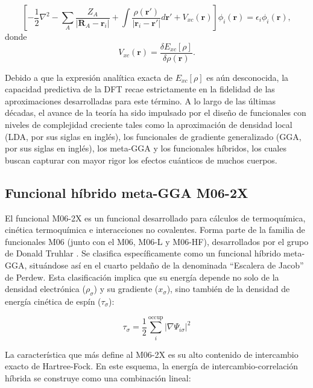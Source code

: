 \begin{equation}
    \left[ -\frac{1}{2}\nabla^2 - \sum_A \frac{Z_A}{|\mathbf{R}_{A} - \mathbf{r}_i|} + \int \frac{\rho(\mathbf{r}')}{|\mathbf{r}_i - \mathbf{r}'|} d\mathbf{r}' + V_{xc}(\mathbf{r}) \right] \phi_i(\mathbf{r}) = \epsilon_i \phi_i(\mathbf{r}),
    \label{eq:kohn_sham_final}    
\end{equation}
donde
\begin{equation}
    V_{xc}(\mathbf{r}) = \frac{\delta E_{xc}[\rho]}{\delta \rho(\mathbf{r})}.
    \label{eq:exchange_correlation_potential}
\end{equation}

Debido a que la expresión analítica exacta de $E_{xc}[\rho]$ es aún desconocida, la capacidad predictiva de la DFT recae estrictamente en la fidelidad de las aproximaciones desarrolladas para este término. A lo largo de las últimas décadas, el avance de la teoría ha sido impulsado por el diseño de funcionales con niveles de complejidad creciente tales como la aproximación de densidad local (LDA, por sus siglas en inglés), los funcionales de gradiente generalizado (GGA, por sus siglas en inglés), los meta-GGA y los funcionales híbridos, los cuales buscan capturar con mayor rigor los efectos cuánticos de muchos cuerpos.

\subsection{Funcional híbrido meta-GGA M06-2X}

El funcional M06-2X es un funcional desarrollado para cálculos de termoquímica, cinética termoquímica e interacciones no covalentes. Forma parte de la familia de funcionales M06 (junto con el M06, M06-L y M06-HF), desarrollados por el grupo de Donald Truhlar \cite{DFT-2008-01}. Se clasifica específicamente como un funcional híbrido meta-GGA, situándose así en el cuarto peldaño de la denominada ``Escalera de Jacob'' de Perdew. Esta clasificación implica que su energía depende no solo de la densidad electrónica ($\rho_\sigma$) y su gradiente ($x_\sigma$), sino también de la densidad de energía cinética de espín ($\tau_\sigma$):

\begin{equation}
    \tau_{\sigma} = \frac{1}{2} \sum_{i}^{\text{occup}} |\nabla \Psi_{i \sigma}|^2
\end{equation}

La característica que más define al M06-2X es su alto contenido de intercambio exacto de Hartree-Fock. En este esquema, la energía de intercambio-correlación híbrida se construye como una combinación lineal:

